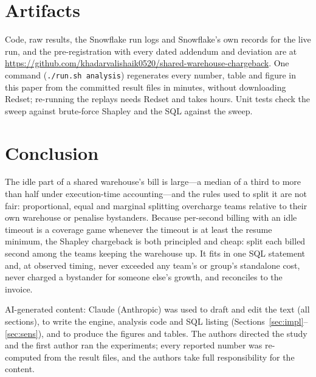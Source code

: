 \documentclass[sigconf]{acmart}
\begin{document}
\section{Artifacts}\label{sec:artifacts}
Code, raw results, the Snowflake run logs and Snowflake's own records for the live run, and the pre-registration with every
dated addendum and deviation are at \url{https://github.com/khadarvalishaik0520/shared-warehouse-chargeback}. One command
(\texttt{./run.sh analysis}) regenerates every number, table and figure in this paper from the committed result files in
minutes, without downloading Redset; re-running the replays needs Redset and takes hours. Unit tests check the sweep
against brute-force Shapley and the SQL against the sweep.

\section{Conclusion}
The idle part of a shared warehouse's bill is large---a median of a third to more than half under execution-time
accounting---and the rules used to split it are not fair: proportional, equal and marginal splitting overcharge teams
relative to their own warehouse or penalise bystanders. Because per-second billing with an idle timeout is a coverage game
whenever the timeout is at least the resume minimum, the Shapley chargeback is both principled and cheap: split each billed
second among the teams keeping the warehouse up. It fits in one SQL statement and, at observed timing, never exceeded any team's or group's
standalone cost, never charged a bystander for someone else's growth, and reconciles to the invoice.

\begin{acks}
AI-generated content: Claude (Anthropic) was used to draft and edit the text (all sections), to write the engine, analysis
code and SQL listing (Sections~\ref{sec:impl}--\ref{sec:sens}), and to produce the figures and tables. The authors directed the study and the first author ran the
experiments; every reported number was re-computed from the result files, and the authors take full responsibility for
the content.
\end{acks}



\end{document}
